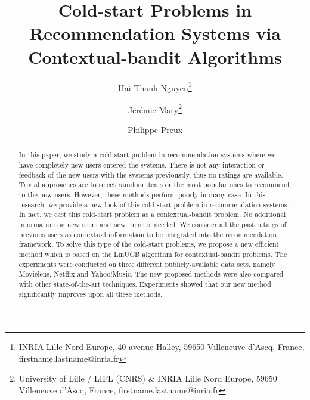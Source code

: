\documentclass[twoside,leqno,twocolumn]{article}
\begin{document}

\title{Cold-start Problems in Recommendation Systems via Contextual-bandit Algorithms}
\author{
Hai Thanh Nguyen\footnote{INRIA Lille Nord Europe, 40 avenue Halley, 59650 Villeneuve d'Ascq, France, firstname.lastname@inria.fr}
\and 
J\'er\'emie Mary\footnote{University of Lille / LIFL (CNRS) \& INRIA Lille Nord Europe, 59650 Villeneuve d'Ascq, France, firstname.lastname@inria.fr}
\and
Philippe Preux\footnotemark[2]
}
\date{}

\maketitle
 

\begin{abstract}
In this paper, we study a cold-start problem in recommendation systems where we have completely new users entered the systems. There is not any interaction or feedback of the new users with the systems previoustly, thus no ratings are available.  Trivial approaches are to select ramdom items or the most popular ones to recommend to the new users. However, these methods perform poorly in many case. In this research, we provide a new look of this cold-start problem in recommendation systems. In fact, we cast this cold-start problem as a contextual-bandit problem. No additional information on new users and new items is needed. We consider all the past ratings of previous users as contextual information to be integrated into the recommendation framework. To solve this type of the cold-start problems, we propose a new efficient method which is based on the LinUCB algorithm for contextual-bandit problems. The experiments were conducted on three different publicly-available data sets, namely Movielens, Netflix and Yahoo!Music. The new proposed methods were also compared with other state-of-the-art techniques. Experiments showed that our new method significantly improves upon all these methods.
\end{abstract}
\end{document}
